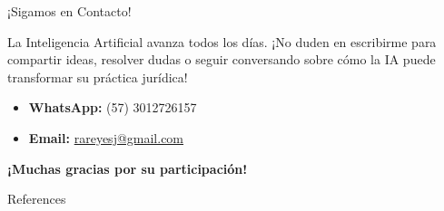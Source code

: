 \documentclass[aspectratio=169]{beamer}
\begin{document}
\begin{frame}{¡Sigamos en Contacto!}


La Inteligencia Artificial avanza todos los días. ¡No duden en escribirme para compartir ideas, resolver dudas o seguir conversando sobre cómo la IA puede transformar su práctica jurídica!

\begin{itemize}
  \item \textbf{WhatsApp:} (57) 3012726157
  \item \textbf{Email:} \href{mailto:rareyesj@gmail.com}{rareyesj@gmail.com}
\end{itemize}
\textbf{¡Muchas gracias por su participación!}


\end{frame}



\begin{frame}[allowframebreaks]{References}
  
  
\end{frame}
\end{document}
